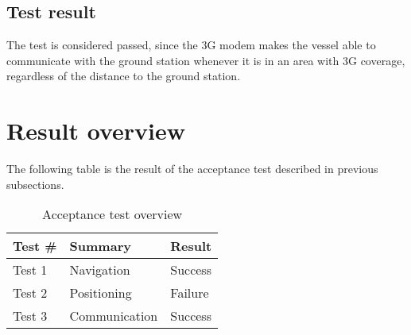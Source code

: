 \subsection{Test result}
The test is considered passed, since the 3G modem makes the vessel able to communicate with the ground station whenever it is in an area with 3G coverage, regardless of the distance to the ground station.

\section{Result overview}
The following table is the result of the acceptance test described in previous subsections.
\begin{table}[h]
\centering
\begin{tabular}{lll}
\toprule
\textbf{Test \#} & \textbf{Summary} & \textbf{Result}\\
\midrule
Test 1 & Navigation &Success\\
Test 2 & Positioning & Failure\\
Test 3 & Communication & Success\\
\bottomrule
\end{tabular}
\caption{Acceptance test overview}
\label{tab:accept}
\end{table}
